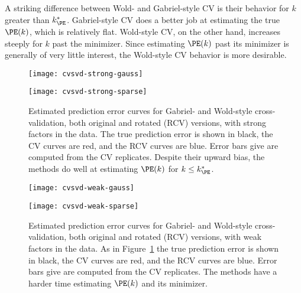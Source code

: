A striking difference between Wold- and Gabriel-style CV is their behavior for $k$ greater than $k^\ast_\PE$.  Gabriel-style CV does a better job at estimating the true $\PE(k)$, which is relatively flat.  Wold-style CV, on the other hand, increases steeply for $k$ past the minimizer.  Since estimating $\PE(k)$ past its minimizer is generally of very little interest, the Wold-style CV behavior is more desirable.

\begin{figure}[ht]\label{F:cvsvd-pe-strong}
    \centering
    \begin{minipage}{0.49\textwidth}
        \begin{center}
            \texttt{[image: cvsvd-strong-gauss]}
        \end{center}
    \end{minipage}
    \begin{minipage}{0.49\textwidth}
        \begin{center}
            \texttt{[image: cvsvd-strong-sparse]}
        \end{center}
    \end{minipage}
    \caption{
        Estimated prediction error curves for Gabriel- and Wold-style
        cross-validation, both original and rotated (RCV) versions, with
        strong factors in the data.  
        The true prediction error is shown in black, the CV curves are red, 
        and the RCV curves are blue.  Error bars give are computed from the 
        CV replicates.  Despite their upward bias, the methods do
        well at estimating $\PE(k)$ for $k \leq k^\ast_\PE$.
    }
\end{figure}


\begin{figure}[ht]\label{F:cvsvd-pe-weak}
    \centering
    \begin{minipage}{0.49\textwidth}
        \begin{center}
            \texttt{[image: cvsvd-weak-gauss]}
        \end{center}
    \end{minipage}
    \begin{minipage}{0.49\textwidth}
        \begin{center}
            \texttt{[image: cvsvd-weak-sparse]}
        \end{center}
    \end{minipage}
    \caption{
        Estimated prediction error curves for Gabriel- and Wold-style
        cross-validation, both original and rotated (RCV) versions, with
        weak factors in the data.  As in Figure~\ref{F:cvsvd-pe-strong} the
        true prediction error is shown in black, the CV curves are red, and
        the RCV curves are blue.  Error bars give are computed from the 
        CV replicates.  The methods have a harder time estimating $\PE(k)$
        and its minimizer.
    }
\end{figure}

